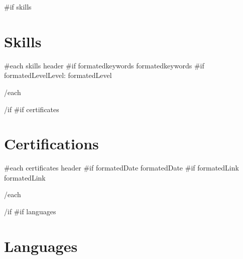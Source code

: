 \documentclass{article}
\begin{document}
\color{primary-950}

\begin{paracol}{2}
\begin{leftcolumn*}
\titleformat{\section}{\color{accent}\raggedright\normalsize\bfseries\uppercase}{}{0ex}{}
\titlespacing{\section}{0ex}{0.75ex}{0.75ex}
{{#if skills}}\section*{Skills}{
  {{#each skills}}
    {{ header }}\newline
    {{#if formatedkeywords}}{{ formatedkeywords }}
    {{#if formatedLevel}}Level: {{ formatedLevel }}
    \par
  {{/each}}
}{{/if}}
{{#if certificates}}\section*{Certifications}{
  {{#each certificates}}
    {{ header }}\newline
    {{#if formatedDate}}{{ formatedDate }}
    {{#if formatedLink}}{{ formatedLink }}
    \par
  {{/each}}
}{{/if}}
{{#if languages}}\section*{Languages}{
}
\end{leftcolumn*}
\end{paracol}
\end{document}
